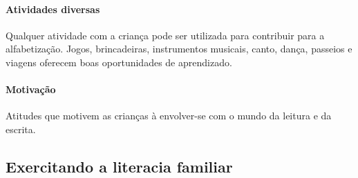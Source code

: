 \documentclass[11pt]{extarticle}
\begin{document}
\paragraph{Atividades diversas} Qualquer atividade com a criança 
pode ser utilizada para contribuir para a alfabetização. Jogos, brincadeiras, 
instrumentos musicais, canto, dança, passeios e viagens oferecem boas 
oportunidades de aprendizado.

\paragraph{Motivação} Atitudes que motivem as crianças à envolver-se com 
o mundo da leitura e da escrita.

\subsection{Exercitando a literacia familiar}

\end{document}
